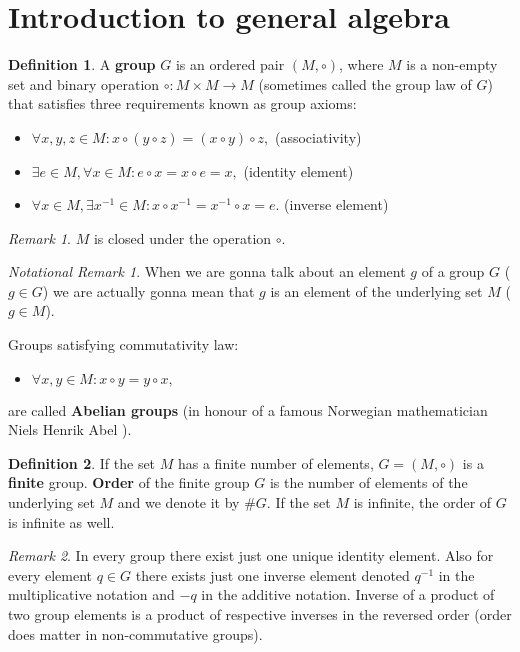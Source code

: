 \documentclass[thesis=M,english]{FITthesis}[2012/10/20]
\theoremstyle{remark}
\newtheorem*{RM}{Remark}
\newtheorem*{NRM}{Notational Remark}
\theoremstyle{definition}
\newtheorem{DF}{Definition}[section]
\begin{document}
\section{Introduction to general algebra}
\begin{DF}
A \textbf{group} $G$ is an ordered pair $(M,  \circ)$, where $M$ is a non-empty set and binary operation $\circ : M \times M \to M $ (sometimes called the group law of $G$) that satisfies three requirements known as group axioms: 
\end{DF}
\begin{itemize}
\item 
$ \forall x,y,z \in M: x\circ (y \circ z) = (x \circ y) \circ z,$ \hfill (associativity)
\item 
$ \exists e \in M, \forall x \in M: e \circ x = x \circ e = x,$ \hfill (identity element)
\item 
$\forall x \in M, \exists x^{-1} \in M: x \circ x^{-1} = x^{-1} \circ x = e.$ \hfill (inverse element)
\end{itemize}
\begin{RM}
$M$ is closed under the operation $\circ$. 
\end{RM}
\begin{NRM}
When we are gonna talk about an element  $g$ of a group $G$ ($g \in G$) we are actually gonna mean that $g$ is an element of the underlying set $M$ ($g \in M$).
\end{NRM}
Groups satisfying commutativity law:
\begin{itemize}
\item 
$ \forall x, y\in M: x \circ y = y \circ x,$
\end{itemize}
are called \textbf{Abelian groups} (in honour of a famous Norwegian mathematician Niels Henrik Abel \cite{Abel}). 
\begin{DF}
If the set $M$ has a finite number of elements, $G = (M, \circ)$ is a \textbf{finite} group. \textbf{Order} of the finite group $G$ is the number of elements of the underlying set $M$ and we denote it by $\#G$. If the set $M$ is infinite, the order of $G$ is infinite as well.
\end{DF}
\begin{RM}
In every group there exist just one unique identity element. Also for every element $q \in G$ there exists just one inverse element denoted $q^{-1}$ in the multiplicative notation and $-q$ in the additive notation. Inverse of a product of two group elements is a product of respective inverses in the reversed order (order does matter in non-commutative groups).  
\end{RM}
\end{document}
